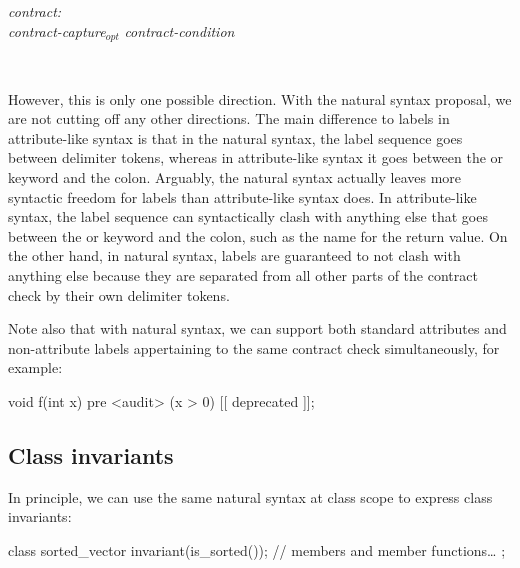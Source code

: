 \begin{adjustwidth}{0.5cm}{0.5cm}

\emph{contract:} \\
\phantom{~~~} \emph{contract-capture}$_{opt}$ \emph{contract-condition}

 \\
\phantom{~~~}

\end{adjustwidth}

However, this is only one possible direction. With the natural syntax proposal, we are not cutting off any other directions. The main difference to labels in attribute-like syntax is that in the natural syntax, the label sequence goes between delimiter tokens, whereas in attribute-like syntax it goes between the  or  keyword and the colon. Arguably, the natural syntax actually leaves more syntactic freedom for labels than attribute-like syntax does. In attribute-like syntax, the label sequence can syntactically clash with anything else that goes between the  or  keyword and the colon, such as the name for the return value. On the other hand, in natural syntax, labels are guaranteed to not clash with anything else because they are separated from all other parts of the contract check by their own delimiter tokens.

Note also that with natural syntax, we can support both standard attributes and non-attribute labels appertaining to the same contract check simultaneously, for example:

\begin{codeblock}
void f(int x)
  pre <audit> (x > 0) [[ deprecated ]];
\end{codeblock}


\subsection{Class invariants}
\label{subsec:invariants}

In principle, we can use the same natural syntax at class scope to express class invariants:

\begin{codeblock}
class sorted_vector {
  invariant(is_sorted());
  // members and member functions…
};
\end{codeblock}

